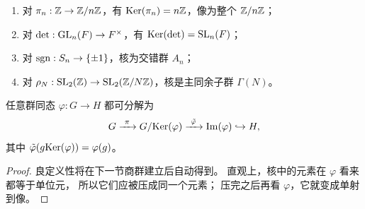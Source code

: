 \begin{example}[典型核与像]
\begin{enumerate}[label=\textnormal{(\arabic*)}, leftmargin=3em]
  \item 对 $\pi_n:\mathbb{Z}\to \mathbb{Z}/n\mathbb{Z}$，有 $\mathrm{Ker}(\pi_n)=n\mathbb{Z}$，像为整个 $\mathbb{Z}/n\mathbb{Z}$；
  \item 对 $\det:\mathrm{GL}_n(F)\to F^\times$，有 $\mathrm{Ker}(\det)=\mathrm{SL}_n(F)$；
  \item 对 $\operatorname{sgn}:S_n\to \{\pm1\}$，核为交错群 $A_n$；
  \item 对 $\rho_N:\mathrm{SL}_2(\mathbb{Z})\to \mathrm{SL}_2(\mathbb{Z}/N\mathbb{Z})$，核是主同余子群 $\Gamma(N)$。
\end{enumerate}
\end{example}
\begin{proposition}[因子化到像]
任意群同态 $\varphi:G\to H$ 都可分解为
\[ G\xrightarrow{\ \pi\ } G/\mathrm{Ker}(\varphi) \xrightarrow{\ \tilde\varphi\ } \mathrm{Im}(\varphi) \hookrightarrow H, \]
其中 $\tilde\varphi(g\mathrm{Ker}(\varphi))=\varphi(g)$。
\end{proposition}
\begin{proof}
良定义性将在下一节商群建立后自动得到。
直观上，核中的元素在 $\varphi$ 看来都等于单位元，
所以它们应被压成同一个元素；
压完之后再看 $\varphi$，它就变成单射到像。
\end{proof}
